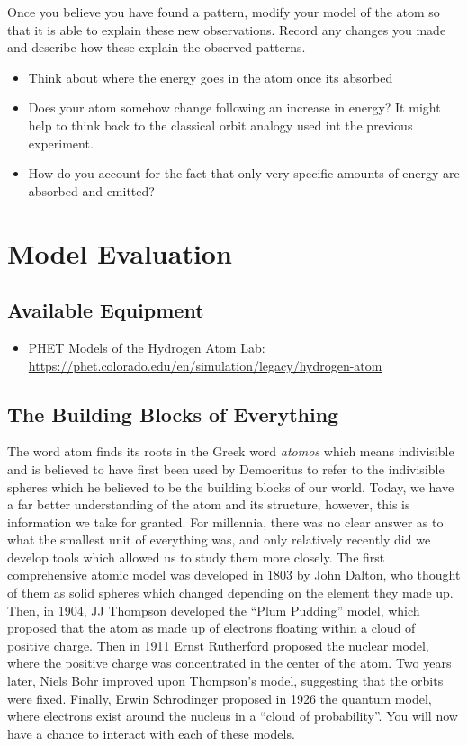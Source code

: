 \begin{steps}
	\item Once you believe you have found a pattern, modify your model of the atom so that it is able to explain these new observations. Record any changes you made and describe how these explain the observed patterns.
	\begin{itemize}
		\item Think about where the energy goes in the atom once its absorbed
		
		\item Does your atom somehow change following an increase in energy? It might help to think back to the classical orbit analogy used int the previous experiment.   
		
		\item How do you account for the fact that only very specific amounts of energy are absorbed and emitted? 
	\end{itemize}
\end{steps}

\section{Model Evaluation}


\subsection{Available Equipment}

\begin{itemize}
	\item PHET Models of the Hydrogen Atom Lab: \url{https://phet.colorado.edu/en/simulation/legacy/hydrogen-atom}
\end{itemize}

\subsection{The Building Blocks of Everything}
 The word atom finds its roots in the Greek word \textit{atomos} which means indivisible and is believed to have first been used by Democritus to refer to the indivisible spheres which he believed to be the building blocks of our world. Today, we have a far better understanding of the atom and its structure, however, this is information we take for granted. For millennia, there was no clear answer as to what the smallest unit of everything was, and only relatively recently did we develop tools which allowed us to study them more closely. The first comprehensive atomic model was developed in 1803 by John Dalton, who thought of them as solid spheres which changed depending on the element they made up. Then, in 1904, JJ Thompson developed the ``Plum Pudding'' model, which proposed that the atom as made up of electrons floating within a cloud of positive charge. Then in 1911 Ernst Rutherford proposed the nuclear model, where the positive charge was concentrated in the center of the atom. Two years later, Niels Bohr improved upon Thompson's model, suggesting that the orbits were fixed. Finally, Erwin Schrodinger proposed in 1926 the quantum model, where electrons exist around the nucleus in a ``cloud of probability''. You will now have a chance to interact with each of these models.

